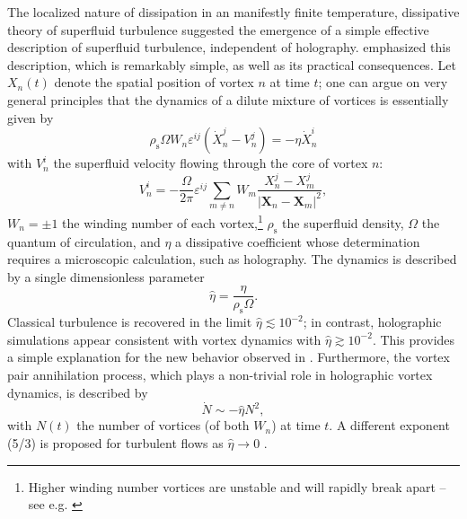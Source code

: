 \documentclass[10pt, oneside]{book}
\begin{document}
\begin{doublespace}
The localized nature of dissipation in an manifestly finite temperature, dissipative theory of superfluid turbulence suggested the emergence of a simple effective description of superfluid turbulence, independent of holography.  \cite{Chesler:2014pka} emphasized this description, which is remarkably simple, as well as its practical consequences.   Let $X_n(t)$ denote the spatial position of vortex $n$ at time $t$;  one can argue on very general principles that the dynamics of a dilute mixture of vortices is essentially given by\begin{equation}
\rho_{\mathrm{s}}\Omega W_n \varepsilon^{ij} \left(\dot{X}^j_n - V^j_n\right) = -\eta \dot{X}^i_n
\end{equation}
with $V_n^i$ the superfluid velocity flowing through the core of vortex $n$: \begin{equation}
V^i_n = -\frac{\Omega}{2\pi} \varepsilon^{ij} \sum_{m\ne n} W_m \frac{X_n^j - X_m^j}{|\mathbf{X}_n-\mathbf{X}_m|^2},
\end{equation}
$W_n=\pm1 $ the winding number of each vortex,\footnote{Higher winding number vortices are unstable and will rapidly break apart -- see e.g. \cite{Adams:2012pj}} $\rho_{\mathrm{s}}$ the superfluid density, $\Omega$ the quantum of circulation, and $\eta$ a dissipative coefficient whose determination requires a microscopic calculation, such as holography.   The dynamics is described by a single dimensionless parameter \begin{equation}
\hat \eta = \frac{\eta}{\rho_{\mathrm{s}}\Omega}.
\end{equation}
Classical turbulence is recovered in the limit $\hat\eta \lesssim 10^{-2}$;  in contrast, holographic simulations appear consistent with vortex dynamics with $\hat\eta \gtrsim 10^{-2}$.   This provides a simple explanation for the new behavior observed in \cite{Adams:2012pj}.    Furthermore, the vortex pair annihilation process, which plays a non-trivial role in holographic vortex dynamics, is described by \begin{equation}
\dot{N} \sim -\hat\eta N^2,  \label{dndt}
\end{equation}with $N(t)$ the number of vortices (of both $W_n$) at time $t$.  A different exponent (5/3) is proposed for turbulent flows as $\hat\eta\rightarrow 0$ \cite{Chesler:2014pka}.   


\end{doublespace}
\end{document}
